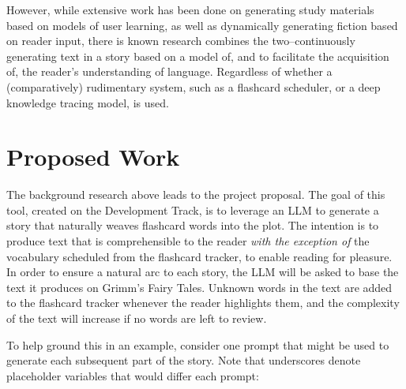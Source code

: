 \documentclass[
	letterpaper, %
]{jdf}
\begin{document}
However, while extensive work has been done on generating study materials based on models of user learning, as well as dynamically generating fiction based on reader input, there is known research combines the two–continuously generating text in a story based on a model of, and to facilitate the acquisition of, the reader's understanding of language. Regardless of whether a (comparatively) rudimentary system, such as a flashcard scheduler, or a deep knowledge tracing model, is used.


\section{Proposed Work}
The background research above leads to the project proposal. The goal of this tool, created on the Development Track, is to leverage an LLM to generate a story that naturally weaves flashcard words into the plot. The intention is to produce text that is comprehensible to the reader \textit{with the exception of} the vocabulary scheduled from the flashcard tracker, to enable reading for pleasure. In order to ensure a natural arc to each story, the LLM will be asked to base the text it produces on Grimm's Fairy Tales. Unknown words in the text are added to the flashcard tracker whenever the reader highlights them, and the complexity of the text will increase if no words are left to review. 

To help ground this in an example, consider one prompt that might be used to generate each subsequent part of the story. Note that underscores denote placeholder variables that would differ each prompt:
\end{document}
